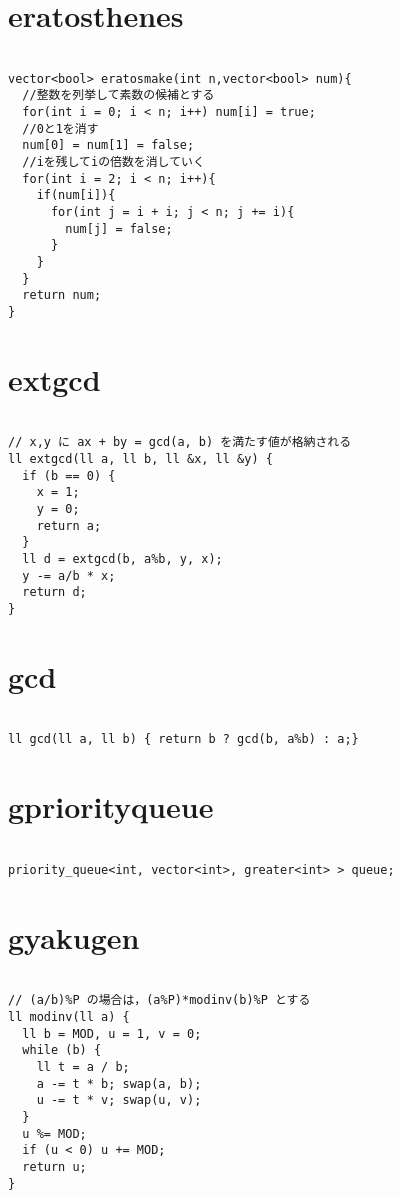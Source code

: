 \documentclass[a4j,titlepage]{jarticle} %
\begin{document}
\color{white}
\section{eratosthenes}
\color{black}
\begin{lstlisting}[caption=eratosthenes]

vector<bool> eratosmake(int n,vector<bool> num){
  //整数を列挙して素数の候補とする
  for(int i = 0; i < n; i++) num[i] = true;
  //0と1を消す
  num[0] = num[1] = false;
  //iを残してiの倍数を消していく
  for(int i = 2; i < n; i++){
    if(num[i]){
      for(int j = i + i; j < n; j += i){
        num[j] = false;
      }
    }
  }
  return num;
}

\end{lstlisting}

\color{white}
\section{extgcd}
\color{black}
\begin{lstlisting}[caption=extgcd]

// x,y に ax + by = gcd(a, b) を満たす値が格納される
ll extgcd(ll a, ll b, ll &x, ll &y) {
  if (b == 0) {
    x = 1;
    y = 0;
    return a;
  }
  ll d = extgcd(b, a%b, y, x);
  y -= a/b * x;
  return d;
}

\end{lstlisting}

\color{white}
\section{gcd}
\color{black}
\begin{lstlisting}[caption=gcd]

ll gcd(ll a, ll b) { return b ? gcd(b, a%b) : a;}

\end{lstlisting}

\color{white}
\section{gpriorityqueue}
\color{black}
\begin{lstlisting}[caption=gpriorityqueue]

priority_queue<int, vector<int>, greater<int> > queue;

\end{lstlisting}

\color{white}
\section{gyakugen}
\color{black}
\begin{lstlisting}[caption=gyakugen]

// (a/b)%P の場合は，(a%P)*modinv(b)%P とする
ll modinv(ll a) {
  ll b = MOD, u = 1, v = 0;
  while (b) {
    ll t = a / b;
    a -= t * b; swap(a, b);
    u -= t * v; swap(u, v);
  }
  u %= MOD;
  if (u < 0) u += MOD;
  return u;
}

\end{lstlisting}
\end{document}
